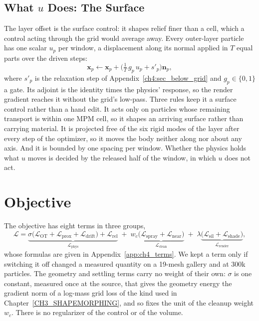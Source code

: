 \subsection{What $u$ Does: The Surface}
\label{ch4:sec_u}
The layer offset is the surface control: it shapes relief finer than a cell, which a control acting through the grid would
average away.
Every outer-layer particle has one scalar $u_p$ per window, a displacement along its normal applied in $T$ equal parts
over the driven steps:
\begin{equation}
\label{ch4:eq_u}
\mathbf{x}_p\leftarrow\mathbf{x}_p+\Big(\tfrac{1}{T}\,g_p\,u_p+s'_p\Big)\mathbf{n}_p ,
\end{equation}
where $s'_p$ is the relaxation step of Appendix~\ref{ch4:sec_below_grid} and $g_p\in\{0,1\}$ a gate. Its adjoint is the
identity times the physics' response, so the render gradient reaches it without the grid's low-pass. Three rules keep it a
surface control rather than a hand edit. It acts only on particles whose remaining transport is within one MPM cell, so it
shapes an arriving surface rather than carrying material. It is projected free of the six rigid modes of the layer after
every step of the optimizer, so it moves the body neither along nor about any axis. And it is bounded by one spacing per
window. Whether the physics holds what $u$ moves is decided by the released half of the window, in which $u$ does not act.

\section{Objective}
\label{ch4:sec_objective}

The objective has eight terms in three groups,
\begin{equation}
\label{ch4:eq_objective}
\mathcal{L}=\underbrace{\sigma\big(\mathcal{L}_{\mathrm{OT}}+\mathcal{L}_{\mathrm{prox}}+\mathcal{L}_{\mathrm{drift}}\big)
 +\mathcal{L}_{\mathrm{rel}}}_{\mathcal{L}_{\mathrm{phys}}}
 \;+\;w_c\underbrace{\big(\mathcal{L}_{\mathrm{spray}}+\mathcal{L}_{\mathrm{near}}\big)}_{\mathcal{L}_{\mathrm{clean}}}
 \;+\;\lambda\underbrace{\big(\mathcal{L}_{\mathrm{sil}}+\mathcal{L}_{\mathrm{shade}}\big)}_{\mathcal{L}_{\mathrm{render}}} ,
\end{equation}
whose formulas are given in Appendix~\ref{app:ch4_terms}. We kept a term only if switching it off changed a measured
quantity on a 19-mesh gallery and at 300k particles. The geometry and settling terms carry no weight of their own: $\sigma$
is one constant, measured once at the source, that gives the geometry energy the gradient norm of a log-mass grid loss of
the kind used in Chapter~\ref{CH3_SHAPEMORPHING}, and so fixes the unit of the cleanup weight $w_c$. There is no
regularizer of the control or of the volume.

